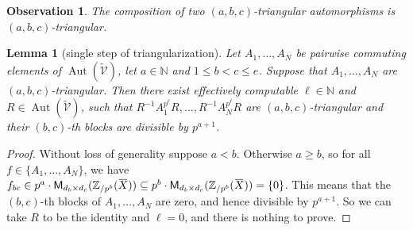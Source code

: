 \documentclass[letterpaper, 11pt, thm-restate]{article}
\numberwithin{equation}{section}
\newcommand{\Z}{\mathbb{Z}}
\newcommand{\N}{\mathbb{N}}
\newcommand{\Aut}{\operatorname{Aut}}
\newcommand{\M}{\mathsf{M}}
\newcommand{\tmV}{\widetilde{\mathcal{V}}}
\newcommand{\oX}{\mkern 1.5mu\overline{\mkern-1.5mu X \mkern-1.5mu}\mkern 1.5mu}
\newtheorem{lem}[thrm]{Lemma}
\newtheorem{obs}[thrm]{Observation}
\theoremstyle{definition}
\theoremstyle{definition}
\theoremstyle{definition}
\begin{document}
\begin{obs}
    The composition of two $(a,b,c)$-triangular automorphisms is $(a,b,c)$-triangular.
\end{obs}

\begin{lem}[single step of triangularization]\label{lem:singletriangularization}
    Let $A_1, \ldots, A_N$ be pairwise commuting elements of $\Aut(\tmV)$, let $a \in \N$ and $1 \leq b < c \leq e$. 
    Suppose that $A_1, \ldots, A_N$ are $(a,b,c)$-triangular.
    Then there exist effectively computable $\ell \in \N$ and $R \in \Aut(\tmV)$, such that $R^{-1}A_1^{p^{\ell}}R, \ldots, R^{-1}A_N^{p^{\ell}}R$ are $(a,b,c)$-triangular and their $(b,c)$-th blocks are divisible by $p^{a+1}$.
\end{lem}
\begin{proof}
    Without loss of generality suppose $a < b$. Otherwise $a \geq b$, so for all $f \in \{A_1, \ldots, A_N\}$, we have $f_{bc} \in p^a \cdot \M_{d_b \times d_c}(\Z_{/p^b}(\oX)) \subseteq p^b \cdot \M_{d_b \times d_c}(\Z_{/p^b}(\oX)) = \{0\}$.
    This means that the $(b,c)$-th blocks of $A_1, \ldots, A_N$ are zero, and hence divisible by $p^{a+1}$.
    So we can take $R$ to be the identity and $\ell = 0$, and there is nothing to prove.


\end{proof}
\end{document}
